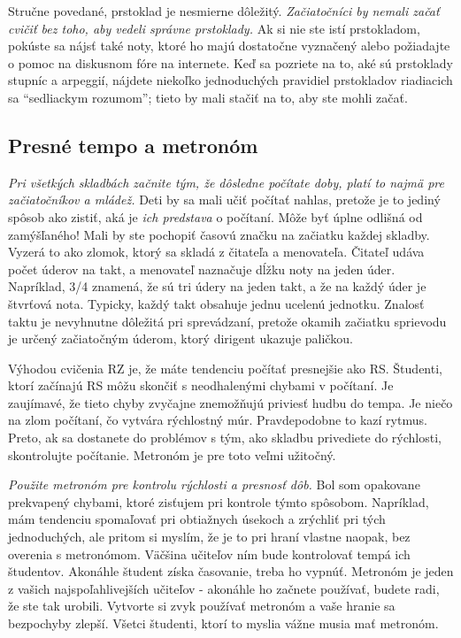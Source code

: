 Stručne povedané, prstoklad je nesmierne dôležitý. \emph{Začiatočníci by nemali začať cvičiť bez toho, aby vedeli správne prstoklady.} Ak si nie ste istí prstokladom, pokúste sa nájsť také noty, ktoré ho majú dostatočne vyznačený alebo požiadajte o pomoc na diskusnom fóre na internete. Keď sa pozriete na to, aké sú prstoklady stupníc a arpeggií, nájdete niekoľko jednoduchých pravidiel prstokladov riadiacich sa “sedliackym rozumom”; tieto by mali stačiť na to, aby ste mohli začať.

\subsection{Presné tempo a metronóm}
\emph{Pri všetkých skladbách začnite tým, že dôsledne počítate doby, platí to najmä pre začiatočníkov a mládež.} Deti by sa mali učiť počítať nahlas, pretože je to jediný spôsob ako zistiť, aká je \textit{ich predstava} o počítaní. Môže byť úplne odlišná od zamýšľaného! Mali by ste pochopiť časovú značku na začiatku každej skladby. Vyzerá to ako zlomok, ktorý sa skladá z čitateľa a menovateľa. Čitateľ udáva počet úderov na takt, a menovateľ naznačuje dĺžku noty na jeden úder. Napríklad, 3/4 znamená, že sú tri údery na jeden takt, a že na každý úder je štvrťová nota. Typicky, každý takt  obsahuje jednu ucelenú jednotku. Znalosť taktu je nevyhnutne dôležitá pri sprevádzaní, pretože okamih začiatku sprievodu je určený začiatočným úderom, ktorý dirigent ukazuje paličkou.

Výhodou cvičenia RZ je, že máte tendenciu počítať presnejšie ako RS. Študenti, ktorí začínajú RS môžu skončiť s neodhalenými chybami v počítaní. Je zaujímavé, že tieto chyby zvyčajne znemožňujú priviesť hudbu do tempa. Je niečo na zlom počítaní, čo vytvára rýchlostný múr. Pravdepodobne to kazí rytmus. Preto, ak sa dostanete do problémov s tým, ako skladbu privediete do rýchlosti, skontrolujte počítanie. Metronóm je pre toto veľmi užitočný.

\emph{Použite metronóm pre kontrolu rýchlosti a presnosť dôb.} Bol som opakovane prekvapený chybami, ktoré zisťujem pri kontrole týmto spôsobom. Napríklad, mám tendenciu spomaľovať pri obtiažnych úsekoch a zrýchliť pri tých jednoduchých, ale pritom si myslím, že je to pri hraní vlastne naopak, bez overenia s metronómom. Väčšina učiteľov ním bude kontrolovať tempá ich študentov. Akonáhle študent získa časovanie, treba ho vypnúť. Metronóm je jeden z vašich najspoľahlivejších učiteľov - akonáhle ho začnete používať, budete radi, že ste tak urobili. Vytvorte si zvyk používať metronóm a vaše hranie sa bezpochyby zlepší. Všetci študenti, ktorí to myslia vážne musia mať metronóm.

